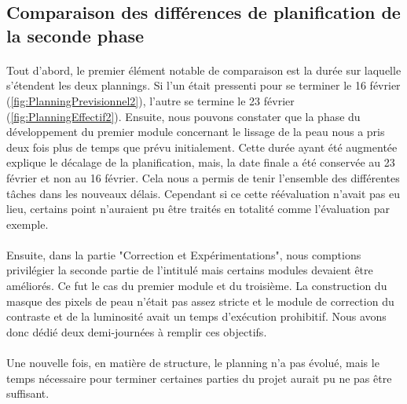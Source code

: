 \documentclass[11pt, french]{report-rd-info}
\begin{document}
\subsection{Comparaison des différences de planification de la seconde phase}
\paragraph*{}
Tout d'abord, le premier élément notable de comparaison est la durée sur laquelle s'étendent les deux plannings. Si l'un était pressenti pour se terminer le 16 février (\ref{fig:PlanningPrevisionnel2}), l'autre se termine le 23 février (\ref{fig:PlanningEffectif2}). Ensuite, nous pouvons constater que la phase du développement du premier module concernant le lissage de la peau nous a pris deux fois plus de temps que prévu initialement. Cette durée ayant été augmentée explique le décalage de la planification, mais, la date finale a été conservée au 23 février et non au 16 février. Cela nous a permis de tenir l'ensemble des différentes tâches dans les nouveaux délais. Cependant si ce cette réévaluation n'avait pas eu lieu, certains point n'auraient pu être traités en totalité comme l'évaluation par exemple.
\paragraph*{}
Ensuite, dans la partie "Correction et Expérimentations", nous comptions privilégier la seconde partie de l'intitulé mais certains modules devaient être améliorés. Ce fut le cas du premier module et du troisième. La construction du masque des pixels de peau n'était pas assez stricte et le module de correction du contraste et de la luminosité avait un temps d'exécution prohibitif. Nous avons donc dédié deux demi-journées à remplir ces objectifs. 
\paragraph*{}
Une nouvelle fois, en matière de structure, le planning n'a pas évolué, mais le temps nécessaire pour terminer certaines parties du projet aurait pu ne pas être suffisant.
\end{document}
